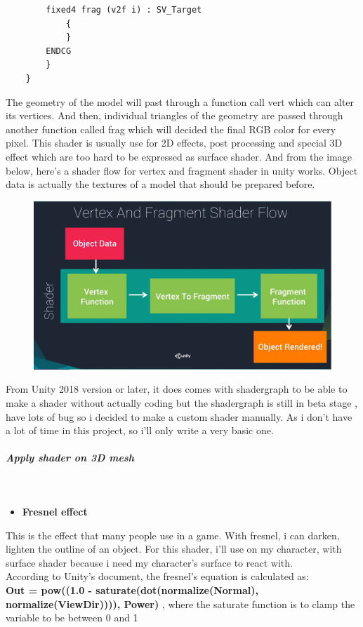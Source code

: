 \documentclass[a4paper, 13pt]{extarticle}
\begin{document}
{\begin{itemize}
\begin{lstlisting}
 		fixed4 frag (v2f i) : SV_Target
 			{
 			}
 		ENDCG
 		}
 	}
 \end{lstlisting}
 \end{itemize}
The geometry of the model will past through a function call vert which can alter its vertices. And then, individual triangles of the geometry are passed through another function called frag which will decided the final RGB color for every pixel. This shader is usually use for 2D effects, post processing and special 3D effect which are too hard to be expressed as surface shader. And from the image below, here's a shader flow for vertex and fragment shader in unity works. Object data is actually the textures of a model that should be prepared before.
   \begin{figure}[h]
	\begin{minipage}{1\textwidth}
		\centering
		\includegraphics[width=0.55\linewidth]{intructions/vertex_fragment_flow.png}
		\label{fig:test29}
		\centering
	\end{minipage}
\end{figure}
From Unity 2018 version or later, it does comes with shadergraph to be able to make a shader without actually coding but the shadergraph is still in beta stage , have lots of bug so i decided to make a custom shader manually. As i don't have a lot of time in this project, so i'll only write a very basic one. 
 \subparagraph{Apply shader on 3D mesh} ~\\[-0.8cm]
 \begin{itemize}
 	\item \bfseries Fresnel effect
 \end{itemize}
   This is the effect that many people use in a game. With fresnel, i can darken, lighten the outline of an object. For this shader, i'll use on my character, with surface shader because i need my character's surface to react with. \\[0.01cm] According to Unity's document, the fresnel's equation is calculated as: \\ {\bfseries Out = pow((1.0 - saturate(dot(normalize(Normal), normalize(ViewDir)))), Power) }, where the saturate function is to clamp the variable to be between 0 and 1 \\
}
\end{document}
